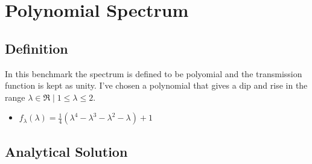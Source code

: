 \documentclass[12pt]{scrartcl}
\newcommand{\dx}[1]{\ensuremath{\,\mathrm{d}#1}}
\begin{document}







\section{Polynomial Spectrum}

\subsection{Definition}

In this benchmark the spectrum is defined to be polyomial and the
transmission function is kept as unity. I've chosen a polynomial
that gives a dip and rise in the range ${\lambda \in \Re \mid 1 \leq \lambda \le 2}$.

\begin{itemize}
  \item $f_\lambda(\lambda) = \frac{1}{4}\left(
  \lambda^4 - \lambda^3 - \lambda^2 - \lambda
  \right) + 1$
\end{itemize}

\subsection{Analytical Solution}
\end{document}
